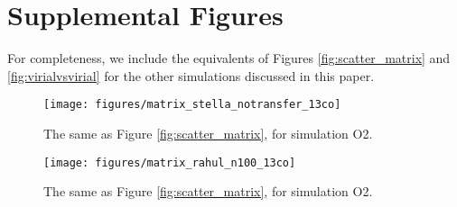 \section{Supplemental Figures}

For completeness, we include the equivalents of Figures \ref{fig:scatter_matrix} and \ref{fig:virialvsvirial} for the other simulations discussed in this paper.


\begin{figure}[htbp]
\texttt{[image: figures/matrix\_stella\_notransfer\_13co]}
\caption{The same as Figure \ref{fig:scatter_matrix}, for simulation O2.}
\label{fig:scatter_matrix_notransfer}
\end{figure}


\begin{figure}[htbp]
\texttt{[image: figures/matrix\_rahul\_n100\_13co]}
\caption{The same as Figure \ref{fig:scatter_matrix}, for simulation O2.}
\label{fig:scatter_matrix_rahul}
\end{figure}
